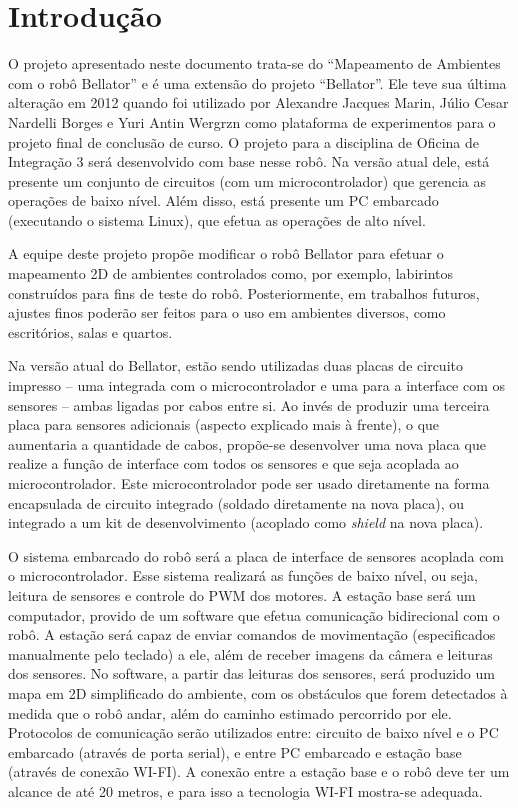 \chapter{Introdução}

O projeto apresentado neste documento trata-se do “Mapeamento de Ambientes com o robô Bellator” e é uma extensão do projeto “Bellator”. Ele teve sua última alteração em 2012 quando foi utilizado por Alexandre Jacques Marin, Júlio Cesar Nardelli Borges e Yuri Antin Wergrzn como plataforma de experimentos para o projeto final de conclusão de curso. O projeto para a disciplina de Oficina de Integração 3 será desenvolvido com base nesse robô. Na versão atual dele, está presente um conjunto de circuitos (com um microcontrolador) que gerencia as operações de baixo nível. Além disso, está presente um PC embarcado (executando o sistema Linux), que efetua as operações de alto nível.

A equipe deste projeto propõe modificar o robô Bellator para efetuar o mapeamento 2D de ambientes controlados como, por exemplo, labirintos construídos para fins de teste do robô. Posteriormente, em trabalhos futuros, ajustes finos poderão ser feitos para o uso em ambientes diversos, como escritórios, salas e quartos.

Na versão atual do Bellator, estão sendo utilizadas duas placas de circuito impresso – uma integrada com o microcontrolador e uma para a interface com os sensores – ambas ligadas por cabos entre si. Ao invés de produzir uma terceira placa para sensores adicionais (aspecto explicado mais à frente), o que aumentaria a quantidade de cabos, propõe-se desenvolver uma nova placa que realize a função de interface com todos os sensores e que seja acoplada ao microcontrolador. Este microcontrolador pode ser usado diretamente na forma encapsulada de circuito integrado (soldado diretamente na nova placa), ou integrado a um kit de desenvolvimento (acoplado como \textit{shield} na nova placa).

O sistema embarcado do robô será a placa de interface de sensores acoplada com o microcontrolador. Esse sistema realizará as funções de baixo nível, ou seja, leitura de sensores e controle do PWM dos motores. A estação base será um computador, provido de um software que efetua comunicação bidirecional com o robô. A estação será capaz de enviar comandos de movimentação (especificados manualmente pelo teclado) a ele, além de receber imagens da câmera e leituras dos sensores. No software, a partir das leituras dos sensores, será produzido um mapa em 2D simplificado do ambiente, com os obstáculos que forem detectados à medida que o robô andar, além do caminho estimado percorrido por ele. Protocolos de comunicação serão utilizados entre: circuito de baixo nível e o PC embarcado (através de porta serial), e entre PC embarcado e estação base (através de conexão WI-FI). A conexão entre a estação base e o robô deve ter um alcance de até 20 metros, e para isso a tecnologia WI-FI mostra-se adequada.

